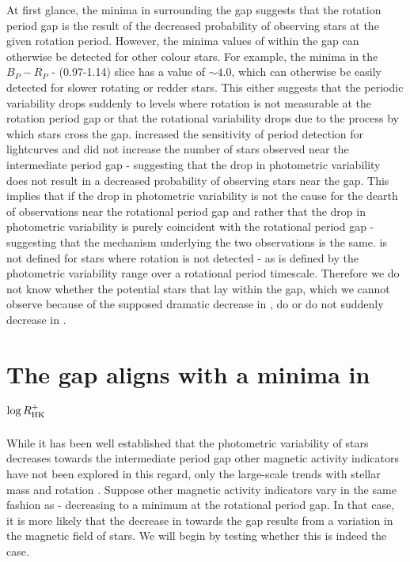 At first glance, the minima in \rper{} surrounding the gap suggests that the rotation period gap is the result of the decreased probability of observing stars at the given rotation period.
However, the minima values of \rper{} within the gap can otherwise be detected for other colour stars.
For example, the minima in the $B_P-R_P$ - (0.97-1.14) slice has a \rper{} value of $\sim 4.0$, which can otherwise be easily detected for slower rotating or redder stars.
This either suggests that the periodic variability drops suddenly to levels where rotation is not measurable at the rotation period gap or that the rotational variability drops due to the process by which stars cross the gap. 
 \citet{santos_surface_2021} increased the sensitivity of period detection for \kepler{} lightcurves and did not increase the number of stars observed near the intermediate period gap - suggesting that the drop in photometric variability does not result in a decreased probability of observing stars near the gap.
This implies that if the drop in photometric variability is not the cause for the dearth of observations near the rotational period gap and rather that the drop in photometric variability is purely coincident with the rotational period gap - suggesting that the mechanism underlying the two observations is the same.
\rper{} is not defined for stars where rotation is not detected - as \rper{} is defined by the photometric variability range over a rotational period timescale.
Therefore we do not know whether the potential stars that lay within the gap, which we cannot observe because of the supposed dramatic decrease in \rper{}, do or do not suddenly decrease in \rper{}.

\section{The gap aligns with a minima in $\log R^{+}_{\rm{HK}}$ }
\label{sec:minima_rhk}

While it has been well established that the photometric variability of stars decreases towards the intermediate period gap other magnetic activity indicators have not been explored in this regard, only the large-scale trends with stellar mass and rotation \citep{zhang_magnetic_2020}.
Suppose other magnetic activity indicators vary in the same fashion as \rper{} - decreasing to a minimum at the rotational period gap. 
In that case, it is more likely that the decrease in \rper{} towards the gap results from a variation in the magnetic field of stars.
We will begin by testing whether this is indeed the case.

